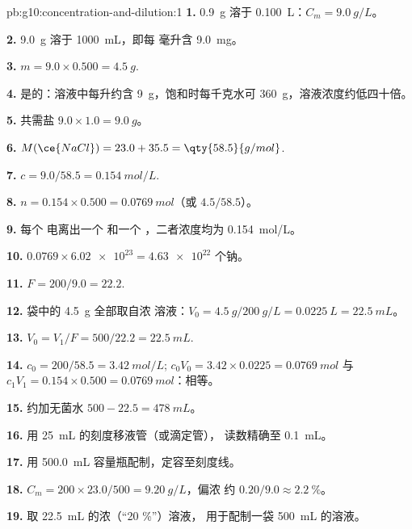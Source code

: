 \begin{solution}{pb:g10:concentration-and-dilution:1}
\textbf{1.} \qty{0.9}{g} 溶于 \qty{0.100}{L}：$C_m = \qty{9.0}{g/L}$。

\textbf{2.} \qty{9.0}{g} 溶于 \qty{1000}{mL}，即每
毫升含 \qty{9.0}{mg}。

\textbf{3.} $m = 9.0 \times 0.500 = \qty{4.5}{g}$.

\textbf{4.} 是的：溶液中每升约含 \qty{9}{g}，饱和时每千克水可
\qty{360}{g}，溶液浓度约低四十倍。

\textbf{5.} 共需盐 $9.0 \times 1.0 = \qty{9.0}{g}$。

\textbf{6.} $M(\ce{NaCl}) = 23.0 + 35.5 = \qty{58.5}{g/mol}$.

\textbf{7.} $c = 9.0 / 58.5 = \qty{0.154}{mol/L}$.

\textbf{8.} $n = 0.154 \times 0.500 = \qty{0.0769}{mol}$（或
$4.5 / 58.5$）。

\textbf{9.} 每个  电离出一个  和一个 ，二者浓度均为
\qty{0.154}{mol/L}。

\textbf{10.} $0.0769 \times \num{6.02e23} = \num{4.63e22}$ 个钠。

\textbf{11.} $F = 200 / 9.0 = 22.2$.

\textbf{12.} 袋中的 \qty{4.5}{g} 全部取自浓
溶液：$V_0 = \qty{4.5}{g} / \qty{200}{g/L} = \qty{0.0225}{L} =
\qty{22.5}{mL}$。

\textbf{13.} $V_0 = V_1 / F = 500 / 22.2 = \qty{22.5}{mL}$.

\textbf{14.} $c_0 = 200 / 58.5 = \qty{3.42}{mol/L}$;
$c_0 V_0 = 3.42 \times 0.0225 = \qty{0.0769}{mol}$ 与
$c_1 V_1 = 0.154 \times 0.500 = \qty{0.0769}{mol}$：相等。

\textbf{15.} 约加无菌水 $500 - 22.5 = \qty{478}{mL}$。

\textbf{16.} 用 \qty{25}{mL} 的刻度移液管（或滴定管），
读数精确至 \qty{0.1}{mL}。

\textbf{17.} 用 \qty{500.0}{mL} 容量瓶配制，定容至刻度线。

\textbf{18.} $C_m = 200 \times 23.0 / 500 = \qty{9.20}{g/L}$，偏浓
约 $0.20 / 9.0 \approx \qty{2.2}{\percent}$。

\textbf{19.} 取 \qty{22.5}{mL} 的浓（“20 \%”）溶液，
用于配制一袋 \qty{500}{mL} 的溶液。
\end{solution}
